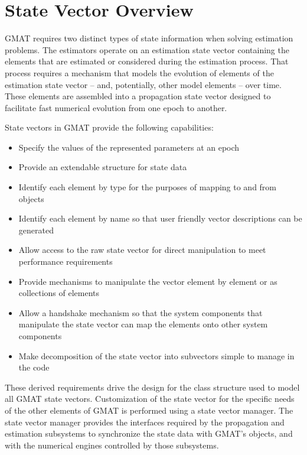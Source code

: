 \section{State Vector Overview}

GMAT requires two distinct types of state information when solving estimation problems.  The
estimators operate on an estimation state vector containing the elements that are estimated or
considered during the estimation process.  That process requires a mechanism that models the
evolution of elements of the estimation state vector -- and, potentially, other model elements --
over time. These elements are assembled into a propagation state vector designed to facilitate fast
numerical evolution from one epoch to another.

State vectors in GMAT provide the following capabilities:

\begin{itemize}
\item Specify the values of the represented parameters at an epoch
\item Provide an extendable structure for state data
\item Identify each element by type for the purposes of mapping to and from objects
\item Identify each element by name so that user friendly vector descriptions can be generated
\item Allow access to the raw state vector for direct manipulation to meet performance requirements
\item Provide mechanisms to manipulate the vector element by element or as collections of elements
\item Allow a handshake mechanism so that the system components that manipulate the state vector
can map the elements onto other system components
\item Make decomposition of the state vector into subvectors simple to manage in the code
\end{itemize}

These derived requirements drive the design for the class structure used to model all GMAT state
vectors.  Customization of the state vector for the specific needs of the other elements of GMAT is
performed using a state vector manager.  The state vector manager provides the interfaces required
by the propagation and estimation subsystems to synchronize the state data with GMAT's objects, and
with the numerical engines controlled by those subsystems.

